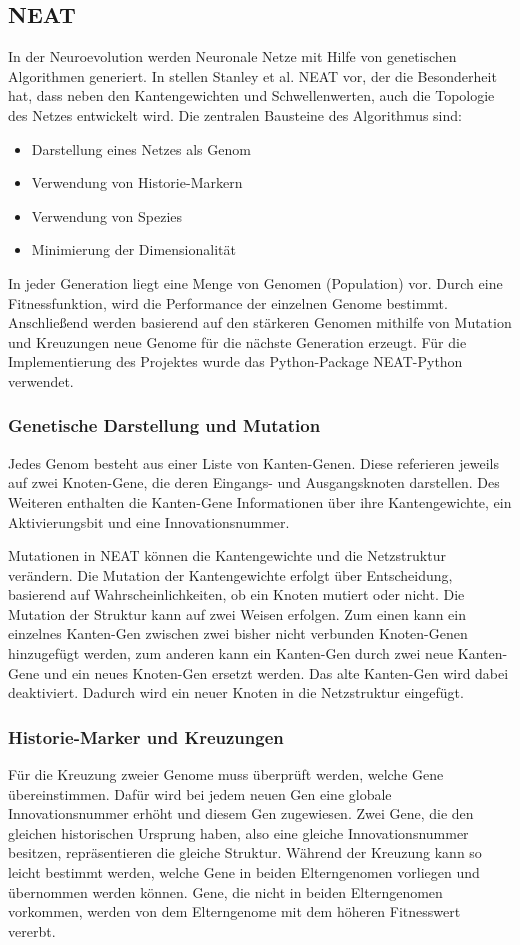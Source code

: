 \documentclass[11pt,final,journal,a4paper,towside,towcolumn]{IEEEtran}
\begin{document}
\subsection{NEAT}
In der Neuroevolution werden Neuronale Netze mit Hilfe von genetischen Algorithmen generiert. In \cite{stanley:gecco02-efficient} stellen Stanley et al. \ac{NEAT} vor, der die Besonderheit hat, dass neben den Kantengewichten und Schwellenwerten, auch die Topologie des Netzes entwickelt wird.
Die zentralen Bausteine des Algorithmus sind:
\begin{itemize}
\item Darstellung eines Netzes als Genom	
\item Verwendung von Historie-Markern
\item Verwendung von Spezies
\item Minimierung der Dimensionalität
\end{itemize}
In jeder Generation liegt eine Menge von Genomen (Population) vor. Durch eine Fitnessfunktion, wird die Performance der einzelnen Genome bestimmt. Anschließend werden basierend auf den stärkeren Genomen mithilfe von Mutation und Kreuzungen neue Genome für die nächste Generation erzeugt. 
Für die Implementierung des Projektes wurde das Python-Package NEAT-Python \cite{python-neat} verwendet.
\subsubsection*{Genetische Darstellung und Mutation}
Jedes Genom besteht aus einer Liste von Kanten-Genen. Diese referieren jeweils auf zwei Knoten-Gene, die deren Eingangs- und Ausgangsknoten darstellen. Des Weiteren enthalten die Kanten-Gene Informationen über ihre Kantengewichte, ein Aktivierungsbit und eine Innovationsnummer. 

Mutationen in \ac{NEAT} können die Kantengewichte und die Netzstruktur verändern. Die Mutation der Kantengewichte erfolgt über Entscheidung, basierend auf Wahrscheinlichkeiten, ob ein Knoten mutiert oder nicht. Die Mutation der Struktur kann auf zwei Weisen erfolgen. Zum einen kann ein einzelnes Kanten-Gen zwischen zwei bisher nicht verbunden Knoten-Genen hinzugefügt werden, zum anderen kann ein Kanten-Gen durch zwei neue Kanten-Gene und ein neues Knoten-Gen ersetzt werden. Das alte Kanten-Gen wird dabei deaktiviert. Dadurch wird ein neuer Knoten in die Netzstruktur eingefügt.
\subsubsection*{Historie-Marker und Kreuzungen}
Für die Kreuzung zweier Genome muss überprüft werden, welche Gene übereinstimmen. Dafür wird bei jedem neuen Gen eine globale Innovationsnummer erhöht und diesem Gen zugewiesen. Zwei Gene, die den gleichen historischen Ursprung haben, also eine gleiche Innovationsnummer besitzen, repräsentieren die gleiche Struktur. Während der Kreuzung kann so leicht bestimmt werden, welche Gene in beiden Elterngenomen vorliegen und übernommen werden können. Gene, die nicht in beiden Elterngenomen vorkommen, werden von dem Elterngenome mit dem höheren Fitnesswert vererbt.
\end{document}
